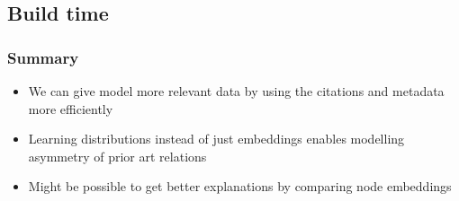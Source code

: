 \documentclass{beamer}
\begin{document}
\subsection{Build time}

\begin{frame}
\frametitle{Summary}
  \begin{itemize}
      \item We can give model more relevant data by using the citations and metadata more efficiently
      \item Learning distributions instead of just embeddings enables modelling asymmetry of prior art relations
      \item Might be possible to get better explanations by comparing node embeddings
  \end{itemize}
\end{frame}
\end{document}
